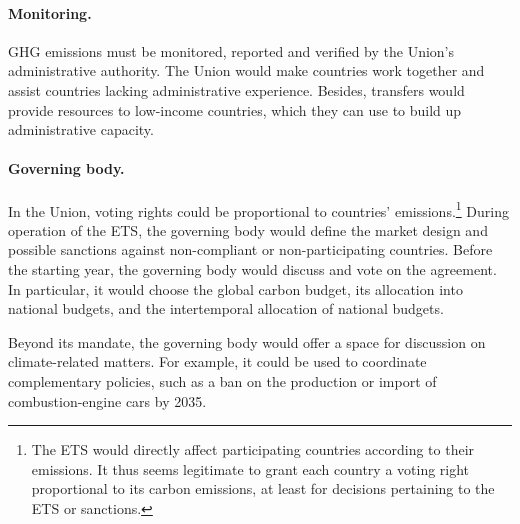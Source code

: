 \documentclass[12pt,english]{article}
\begin{document}
\paragraph{Monitoring.}
GHG emissions must be monitored, reported and verified by the Union's administrative authority. The Union would make countries work together and assist countries lacking administrative experience. Besides, transfers would provide resources to low-income countries, which they can use to build up administrative capacity. 

\paragraph{Governing body.} 
In the Union, voting rights could be proportional to countries' emissions.\footnote{The ETS would directly affect participating countries according to their emissions. It thus seems legitimate to grant each country a voting right proportional to its carbon emissions, at least for decisions pertaining to the ETS or sanctions.} %
During operation of the ETS, the governing body would define the market design and possible sanctions against non-compliant or non-participating countries.  %
Before the starting year, the governing body would discuss and vote on the agreement. In particular, it would choose the global carbon budget, its allocation into national budgets, and the intertemporal allocation of national budgets. 

Beyond its mandate, the governing body would offer a space for discussion on climate-related matters. For example, it could be used to coordinate complementary policies, such as a ban on the production or import of combustion-engine cars by 2035.
\end{document}
